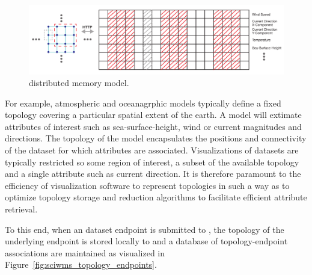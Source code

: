 \begin{figure}[ht!]
  \centering
  \includegraphics[width=\textwidth]{../figs/topology_memModel}
  \caption{\sciwms{} distributed memory model.}
  \label{fig:sciwms_mem_model}
\end{figure}

For example, atmospheric and oceanagrphic models typically define a
fixed topology covering a particular spatial extent of the earth. A
model will extimate attributes of interest such as sea-surface-height,
wind or current magnitudes and directions. The topology of the model
encapsulates the positions and connectivity of the dataset for which
attributes are associated. Visualizations of datasets are typically
restricted so some region of interest, a subset of the available
topology and a single attribute such as current direction. It is
therefore paramount to the efficiency of visualization software to
represent topologies in such a way as to optimize topology storage and
reduction algorithms to facilitate efficient attribute retrieval.

To this end, when an dataset endpoint is submitted to \sciwms{}, the
topology of the underlying endpoint is stored locally to \sciwms{} and
a database of topology-endpoint associations are maintained as
visualized in Figure~\ref{fig:sciwms_topology_endpoints}. 



